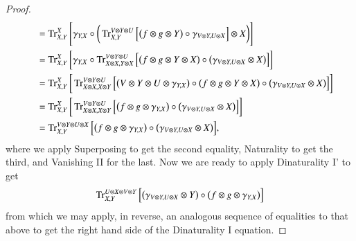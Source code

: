 \documentclass[12pt,oneside,article,draft]{memoir}
\begin{document}
{\begin{proof}
\begin{align*}
  &\quad=\operatorname{Tr}^X_{X,Y}\Bigg[\gamma_{Y,X}\circ\bigg(\operatorname{Tr}^{V\otimes Y\otimes U}_{X,Y}\Big[\big(f\otimes g\otimes Y\big)\circ\gamma_{V\otimes Y,U\otimes X}\Big]\otimes X\bigg)\Bigg]\\
  &\quad=\operatorname{Tr}^X_{X,Y}\bigg[\gamma_{Y,X}\circ\operatorname{Tr}^{V\otimes Y\otimes U}_{X\otimes X,Y\otimes X}\Big[\big(f\otimes g\otimes Y\otimes X\big)\circ\big(\gamma_{V\otimes Y,U\otimes X}\otimes X\big)\Big]\bigg]\\
  &\quad=\operatorname{Tr}^X_{X,Y}\bigg[\operatorname{Tr}^{V\otimes Y\otimes U}_{X\otimes X,X\otimes Y}\Big[\big(V\otimes Y\otimes U\otimes \gamma_{Y,X}\big)\circ\big(f\otimes g\otimes Y\otimes X\big)\circ\big(\gamma_{V\otimes Y,U\otimes X}\otimes X\big)\Big]\bigg]\\
  &\quad=\operatorname{Tr}^X_{X,Y}\bigg[\operatorname{Tr}^{V\otimes Y\otimes U}_{X\otimes X,X\otimes Y}\Big[\big(f\otimes g\otimes \gamma_{Y,X}\big)\circ\big(\gamma_{V\otimes Y,U\otimes X}\otimes X\big)\Big]\bigg]\\
  &\quad=\operatorname{Tr}^{V\otimes Y\otimes U\otimes X}_{X,Y}\Big[\big(f\otimes g\otimes \gamma_{Y,X}\big)\circ\big(\gamma_{V\otimes Y,U\otimes X}\otimes X\big)\Big],
 \end{align*}
 where we apply Superposing to get the second equality, Naturality to get the third, and Vanishing II for the last.
 Now we are ready to apply Dinaturality I' to get
 \begin{align*}
  \operatorname{Tr}^{U\otimes X\otimes V\otimes Y}_{X,Y}\Big[\big(\gamma_{V\otimes Y,U\otimes X}\otimes Y\big)\circ\big(f\otimes g\otimes \gamma_{Y,X}\big)\Big]
 \end{align*}
 from which we may apply, in reverse, an analogous sequence of equalities to that above to get the right hand side of the Dinaturality I equation.
\end{proof}}
\end{document}
